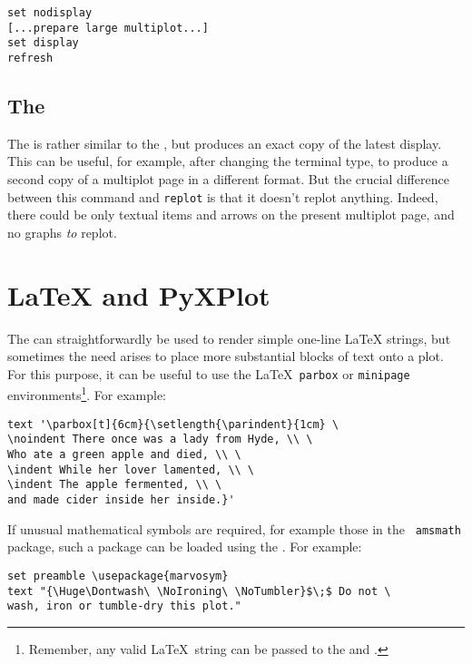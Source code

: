 \begin{verbatim}
set nodisplay
[...prepare large multiplot...]
set display
refresh
\end{verbatim}

\subsection{The }

 The  is rather similar to the
, but produces an exact copy of the latest display. This can be
useful, for example, after changing the terminal type, to produce a second copy
of a multiplot page in a different format. But the crucial difference between
this command and {\tt replot} is that it doesn't replot anything. Indeed, there
could be only textual items and arrows on the present multiplot page, and no
graphs {\it to} replot.

\section{LaTeX and PyXPlot}

The  can straightforwardly be used to render simple one-line
\LaTeX{} strings, but sometimes the need arises to place more
substantial blocks of text onto a plot. For this purpose, it can be useful to
use the \LaTeX\ {\tt parbox} or {\tt minipage} environments\footnote{Remember,
any valid \LaTeX\ string can be passed to the  and .}. For example:

\begin{verbatim}
text '\parbox[t]{6cm}{\setlength{\parindent}{1cm} \
\noindent There once was a lady from Hyde, \\ \
Who ate a green apple and died, \\ \
\indent While her lover lamented, \\ \
\indent The apple fermented, \\ \
and made cider inside her inside.}'
\end{verbatim}

\begin{center}
\end{center}

If unusual mathematical symbols are required, for example those in the {\tt
amsmath} package, such a package
can be loaded using the \indcmdt{set preamble}. For example:

\begin{verbatim}
set preamble \usepackage{marvosym}
text "{\Huge\Dontwash\ \NoIroning\ \NoTumbler}$\;$ Do not \
wash, iron or tumble-dry this plot."
\end{verbatim}


